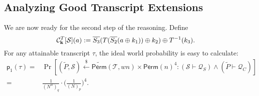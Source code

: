 










\subsection{Analyzing Good Transcript Extensions}
\label{sec:good-tau-4-rounds}

We are now ready for the second step of the reasoning. Define
%
$$\mathcal{C}_{\mathbf{k}}^T[\mathcal{S}](a):=   \overline{S_3}(T(\overline{S_2}(a\oplus k_1))\oplus k_2)\oplus T^{-1}(k_3).$$
%
For any attainable transcript $\tau$, the ideal world probability is easy to calculate:
%
%
\begin{align*}
\mathsf{p}_{1}(\tau)=&\operatorname{Pr}\left[(\widetilde{P},\mathcal{S})\stackrel{\$}{\leftarrow} \widetilde{{\mathsf{Perm}}}(\mathcal{T}, w n)\times\mathsf{Perm}(n)^4: (\mathcal{S} \vdash \mathcal{Q}_{S}) \wedge(\widetilde{P} \vdash \mathcal{Q}_{C})  \right]		\\
=&\frac{1}{(N^w)_q}\cdot\bigg(\frac{1}{(N)_p}\bigg)^4.
\end{align*}




